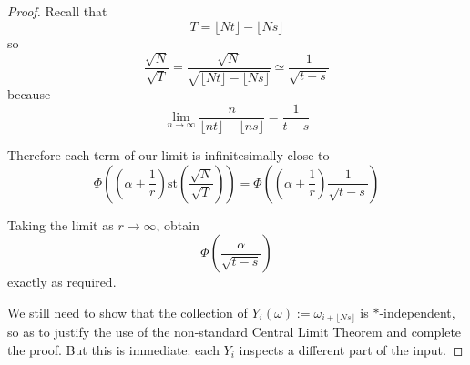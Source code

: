\documentclass[11pt]{amsart}
\theoremstyle{remark}
\newcommand{\st}{\mathrm{st}}
\newcommand{\hyp}[1][\mathbb{R}]{\prescript{*}{}{#1}}
\newcommand{\near}{\simeq}
\newcommand{\gaussian}{\Phi}
\begin{document}
\begin{proof}
Recall that $$T = \lfloor N t \rfloor - \lfloor N s \rfloor$$
so $$\frac{\sqrt{N}}{\sqrt{T}} = \frac{\sqrt{N}}{\sqrt{\lfloor N t \rfloor - \lfloor N s \rfloor}} \near \frac{1}{\sqrt{t-s}}$$
because $$\lim_{n \to \infty} \frac{n}{\lfloor n t \rfloor - \lfloor n s \rfloor} = \frac{1}{t-s}$$

Therefore each term of our limit is infinitesimally close to $$\gaussian \left( \left( \alpha+\frac{1}{r} \right)  \st \left(\frac{\sqrt{N}}{\sqrt{T}} \right) \right) = \gaussian \left(\left( \alpha+\frac{1}{r} \right) \frac{1}{\sqrt{t-s}}\right)$$

Taking the limit as $r \to \infty$, obtain $$\gaussian \left(\frac{\alpha}{\sqrt{t-s}} \right)$$
exactly as required.

We still need to show that the collection of $Y_i(\omega) := \omega_{i+\lfloor Ns \rfloor}$ is $*$-independent, so as to justify the use of the non-standard Central Limit Theorem and complete the proof.
But this is immediate: each $Y_i$ inspects a different part of the input.

%
%
%
\end{proof}
\end{document}
